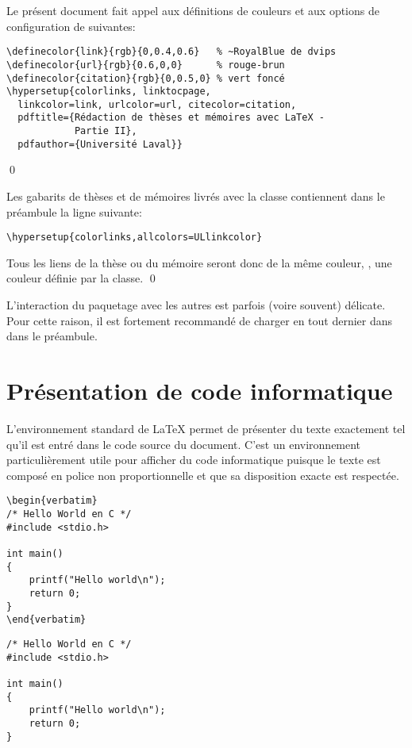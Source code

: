 \begin{exemple}
  \label{ex:trucs:couleurs}
  Le présent document fait appel aux définitions de couleurs
  et aux options de configuration de  suivantes:
\begin{lstlisting}
\definecolor{link}{rgb}{0,0.4,0.6}   % ~RoyalBlue de dvips
\definecolor{url}{rgb}{0.6,0,0}      % rouge-brun
\definecolor{citation}{rgb}{0,0.5,0} % vert foncé
\hypersetup{colorlinks, linktocpage,
  linkcolor=link, urlcolor=url, citecolor=citation,
  pdftitle={Rédaction de thèses et mémoires avec LaTeX -
            Partie II},
  pdfauthor={Université Laval}}
\end{lstlisting}
  \qed
\end{exemple}

\begin{exemple}
  Les gabarits de thèses et de mémoires livrés avec la classe
   contiennent dans le préambule la ligne suivante:
\begin{lstlisting}
\hypersetup{colorlinks,allcolors=ULlinkcolor}
\end{lstlisting}
  Tous les liens de la thèse ou du mémoire seront donc de la même
  couleur,  ,
  une couleur définie par la classe. %
  \qed
\end{exemple}

\begin{conseil}
  L'interaction du paquetage  avec les autres est
  parfois (voire souvent) délicate. Pour cette raison, il est
  fortement recommandé de charger  en tout dernier
  dans dans le préambule.
\end{conseil}



\section{Présentation de code informatique}
\label{sec:trucs:listings}

L'environnement standard  de {\LaTeX} permet de présenter
du texte exactement tel qu'il est entré dans le code source du
document. C'est un environnement particulièrement utile pour afficher
du code informatique puisque le texte est composé en police non
proportionnelle et que sa disposition exacte est respectée.

\begin{demo}
  \begin{texample}
\begin{lstlisting}[deletetexcs={int,include}]
\begin{verbatim}
/* Hello World en C */
#include <stdio.h>

int main()
{
    printf("Hello world\n");
    return 0;
}
\end{verbatim}
\end{lstlisting}
    \producing
\begin{verbatim}
/* Hello World en C */
#include <stdio.h>

int main()
{
    printf("Hello world\n");
    return 0;
}
\end{verbatim}
  \end{texample}
\end{demo}

